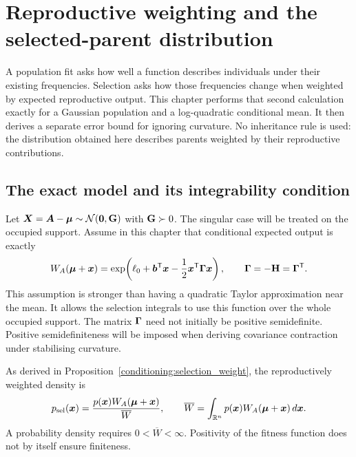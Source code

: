 \chapter{Reproductive weighting and the selected-parent distribution}
\label{selection:chapter}

A population fit asks how well a function describes individuals under
their existing frequencies. Selection asks how those frequencies change
when weighted by expected reproductive output. This chapter performs that
second calculation exactly for a Gaussian population and a log-quadratic
conditional mean. It then derives a separate error bound for ignoring
curvature. No inheritance rule is used: the distribution obtained here
describes parents weighted by their reproductive contributions.

\section{The exact model and its integrability condition}
\label{selection:model}

Let $\boldsymbol{X}=\boldsymbol{A}-\boldsymbol{\mu}\sim\mathcal N(\boldsymbol{0},\mathbf{G})$ with
$\mathbf{G}\succ0$. The singular case will be treated on the occupied
support. Assume in this chapter that conditional expected output is
exactly
\begin{equation}
W_A(\boldsymbol{\mu}+\boldsymbol{x})
 =\exp\!\left(\ell_0+\boldsymbol{b}^{\mathsf T}\boldsymbol{x}
                   -\frac12\boldsymbol{x}^{\mathsf T}\boldsymbol{\Gamma}\boldsymbol{x}\right),
\qquad \boldsymbol{\Gamma}=-\mathbf{H}=\boldsymbol{\Gamma}^{\mathsf T}.
\label{selection:log_quadratic_weight}
\end{equation}
This assumption is stronger than having a quadratic Taylor approximation
near the mean. It allows the selection integrals to use this function
over the whole occupied support. The matrix $\boldsymbol{\Gamma}$ need not initially
be positive semidefinite. Positive semidefiniteness will be imposed when
deriving covariance contraction under stabilising curvature.

As derived in Proposition~\ref{conditioning:selection_weight}, the
reproductively weighted density is
\begin{equation}
p_{\mathrm{sel}}(\boldsymbol{x})
 =\frac{p(\boldsymbol{x})W_A(\boldsymbol{\mu}+\boldsymbol{x})}{\overline W},
\qquad
\overline W=\int_{\mathbb R^n}p(\boldsymbol{x})W_A(\boldsymbol{\mu}+\boldsymbol{x})\,d\boldsymbol{x}.
\label{selection:density_definition}
\end{equation}
A probability density requires $0<\overline W<\infty$. Positivity of
the fitness function does not by itself ensure finiteness.

